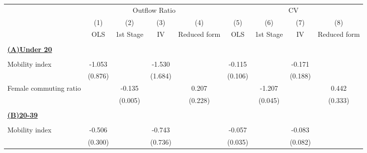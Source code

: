 \begin{tabular}{l*{8}{c}} \toprule
                    &\multicolumn{4}{c}{Outflow Ratio}                                                      &\multicolumn{4}{c}{CV}                                                                 \\\cmidrule(lr){2-5}\cmidrule(lr){6-9}
                    &\multicolumn{1}{c}{(1)}         &\multicolumn{1}{c}{(2)}         &\multicolumn{1}{c}{(3)}         &\multicolumn{1}{c}{(4)}         &\multicolumn{1}{c}{(5)}         &\multicolumn{1}{c}{(6)}         &\multicolumn{1}{c}{(7)}         &\multicolumn{1}{c}{(8)}         \\
                    &         OLS         &   1st Stage         &          IV         &Reduced form         &         OLS         &   1st Stage         &          IV         &Reduced form         \\
\hline \\ \multicolumn{9}{l}{\textbf{\underline{(A)Under 20}}} \\\\[-1ex]
Mobility index      &      -1.053         &                     &      -1.530         &                     &      -0.115         &                     &      -0.171         &                     \\
                    &     (0.876)         &                     &     (1.684)         &                     &     (0.106)         &                     &     (0.188)         &                     \\
\addlinespace
Female commuting ratio&                     &      -0.135\sym{***}&                     &       0.207         &                     &      -1.207\sym{***}&                     &       0.442         \\
                    &                     &     (0.005)         &                     &     (0.228)         &                     &     (0.045)         &                     &     (0.333)         \\
\hline \\ \multicolumn{9}{l}{\textbf{\underline{(B)20-39}}} \\\\[-1ex]
Mobility index      &      -0.506\sym{*}  &                     &      -0.743         &                     &      -0.057         &                     &      -0.083         &                     \\
                    &     (0.300)         &                     &     (0.736)         &                     &     (0.035)         &                     &     (0.082)         &                     \\

\end{tabular}
